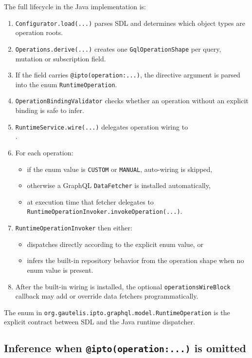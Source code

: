 The full lifecycle in the Java implementation is:
\begin{enumerate}
\item \texttt{Configurator.load(...)} parses SDL and determines which object types are operation roots.
\item \texttt{Operations.derive(...)} creates one \texttt{GqlOperationShape} per query, mutation or subscription field.
\item If the field carries \texttt{@ipto(operation:...)}, the directive argument is parsed into the enum \texttt{RuntimeOperation}.
\item \texttt{OperationBindingValidator} checks whether an operation without an explicit binding is safe to infer.
\item \texttt{RuntimeService.wire(...)} delegates operation wiring to \\ .
\item For each operation:
    \begin{itemize}
    \item if the enum value is \texttt{CUSTOM} or \texttt{MANUAL}, auto-wiring is skipped,
    \item otherwise a GraphQL \texttt{DataFetcher} is installed automatically,
    \item at execution time that fetcher delegates to \texttt{RuntimeOperationInvoker.invokeOperation(...)}.
    \end{itemize}
\item \texttt{RuntimeOperationInvoker} then either:
    \begin{itemize}
    \item dispatches directly according to the explicit enum value, or
    \item infers the built-in repository behavior from the operation shape when no enum value is present.
    \end{itemize}
\item After the built-in wiring is installed, the optional \texttt{operationsWireBlock} callback may add or override data fetchers programmatically.
\end{enumerate}

The enum in \texttt{org.gautelis.ipto.graphql.model.RuntimeOperation} is the explicit contract between SDL and the Java runtime dispatcher.

\subsection{Inference when \texttt{@ipto(operation:...)} is omitted}

